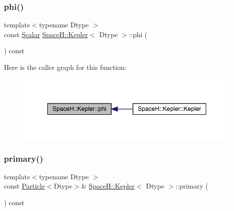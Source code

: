 \subsubsection{\texorpdfstring{phi()}{phi()}}
{\footnotesize\ttfamily template$<$typename Dtype $>$ \\
const \mbox{\hyperlink{struct_space_h_1_1_kepler_a19291f268209f594a96fb4828fa1a54c}{Scalar}} \mbox{\hyperlink{struct_space_h_1_1_kepler}{Space\+H\+::\+Kepler}}$<$ Dtype $>$\+::phi (\begin{DoxyParamCaption}{ }\end{DoxyParamCaption}) const\hspace{0.3cm}{\ttfamily [inline]}}

Here is the caller graph for this function\+:
\nopagebreak
\begin{figure}[H]
\begin{center}
\leavevmode
\includegraphics[width=341pt]{struct_space_h_1_1_kepler_a9c646058e884c4e759039e504c4616c2_icgraph}
\end{center}
\end{figure}
\mbox{\label{struct_space_h_1_1_kepler_a4eec4730b416c39c431ec3251e869aaa}} 
\subsubsection{\texorpdfstring{primary()}{primary()}}
{\footnotesize\ttfamily template$<$typename Dtype $>$ \\
const \mbox{\hyperlink{struct_space_h_1_1_particle}{Particle}}$<$Dtype$>$\& \mbox{\hyperlink{struct_space_h_1_1_kepler}{Space\+H\+::\+Kepler}}$<$ Dtype $>$\+::primary (\begin{DoxyParamCaption}{ }\end{DoxyParamCaption}) const\hspace{0.3cm}{\ttfamily [inline]}}

